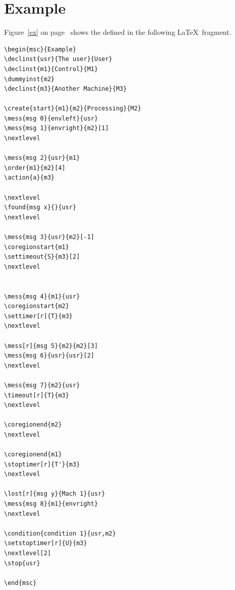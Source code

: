 \documentclass[12pt,a4paper]{article}
\begin{document}
\section{Example}
\label{example}
Figure~\ref{ex} on page~\pageref{ex} shows the \MSC{} defined in the
following \LaTeX\ fragment.

{\small
\begin{verbatim}
\begin{msc}{Example}
\declinst{usr}{The user}{User}
\declinst{m1}{Control}{M1}
\dummyinst{m2}
\declinst{m3}{Another Machine}{M3}

\create{start}{m1}{m2}{Processing}{M2}
\mess{msg 0}{envleft}{usr}
\mess{msg 1}{envright}{m2}[1]
\nextlevel

\mess{msg 2}{usr}{m1}
\order{m1}{m2}[4]
\action{a}{m3}

\nextlevel
\found{msg x}{}{usr}
\nextlevel

\mess{msg 3}{usr}{m2}[-1]
\coregionstart{m1}
\settimeout{S}{m3}[2]
\nextlevel


\mess{msg 4}{m1}{usr}
\coregionstart{m2}
\settimer[r]{T}{m3}
\nextlevel

\mess[r]{msg 5}{m2}{m2}[3]
\mess{msg 6}{usr}{usr}[2]
\nextlevel

\mess{msg 7}{m2}{usr}
\timeout[r]{T}{m3}
\nextlevel

\coregionend{m2}
\nextlevel

\coregionend{m1}
\stoptimer[r]{T'}{m3}
\nextlevel

\lost[r]{msg y}{Mach 1}{usr}
\mess{msg 8}{m1}{envright}
\nextlevel

\condition{condition 1}{usr,m2}
\setstoptimer[r]{U}{m3}
\nextlevel[2]
\stop{usr}

\end{msc}
\end{verbatim}
}
\end{document}
